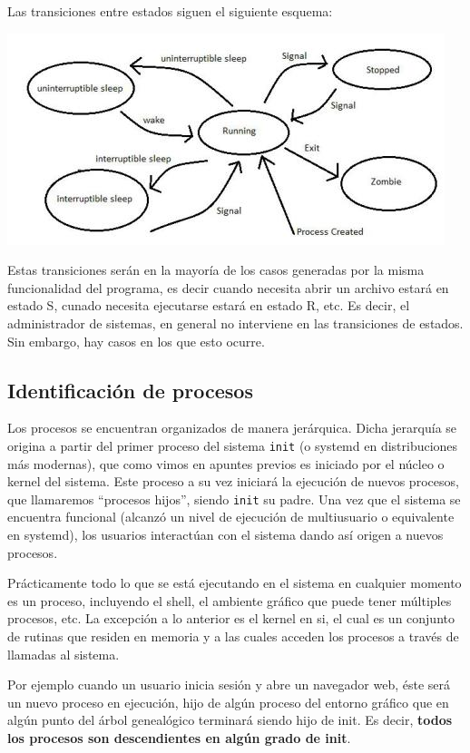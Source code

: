 \documentclass[12pt]{article}
\begin{document}
Las transiciones entre estados siguen el siguiente esquema: 

\begin{center}
\includegraphics{process-states-s.jpg}
\end{center}
 
Estas transiciones serán en la mayoría de los casos generadas por la misma
funcionalidad del programa, es decir cuando necesita abrir un archivo
estará en estado S, cunado necesita ejecutarse estará en estado R, etc. 
Es decir, el administrador de sistemas, en general no interviene en las
transiciones de estados. Sin embargo, hay casos en los que esto ocurre. 

\subsection*{Identificación de procesos}

Los procesos se encuentran organizados de manera jerárquica. Dicha jerarquía se 
origina a partir del primer proceso del sistema {\tt init} (o systemd en 
distribuciones más modernas), que como vimos en apuntes previos es iniciado por 
el núcleo o kernel del sistema. Este proceso a su vez iniciará la ejecución de
nuevos procesos, que llamaremos ``procesos hijos'', siendo {\tt init} su padre.
Una vez que el sistema se encuentra funcional (alcanzó un nivel de ejecución de 
multiusuario o equivalente en systemd), los usuarios interactúan con el sistema
dando así origen a nuevos procesos. 

Prácticamente todo lo que se está ejecutando en el sistema en cualquier momento 
es un proceso, incluyendo el shell, el ambiente gráfico que puede tener 
múltiples procesos, etc. La excepción a lo anterior es el kernel en si, el cual 
es un conjunto de rutinas que residen en memoria y a las cuales acceden los 
procesos a través de llamadas al sistema.

Por ejemplo cuando un usuario inicia sesión y abre un navegador web, éste será 
un nuevo proceso en ejecución, hijo de algún proceso del entorno gráfico que 
en algún punto del árbol genealógico terminará siendo hijo de init. Es decir,
\textbf{todos los procesos son descendientes en algún grado de init}. 
\end{document}
